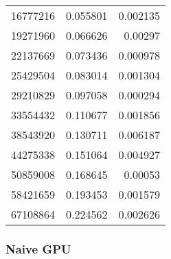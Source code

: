 \begin{tabular}{r r r}
16777216 & 0.055801 & 0.002135 \\
19271960 & 0.066626 & 0.00297 \\
22137669 & 0.073436 & 0.000978 \\
25429504 & 0.083014 & 0.001304 \\
29210829 & 0.097058 & 0.000294 \\
33554432 & 0.110677 & 0.001856 \\
38543920 & 0.130711 & 0.006187 \\
44275338 & 0.151064 & 0.004927 \\
50859008 & 0.168645 & 0.00053 \\
58421659 & 0.193453 & 0.001579 \\
67108864 & 0.224562 & 0.002626 \\
\end{tabular}

\subsubsection{Naive GPU}

